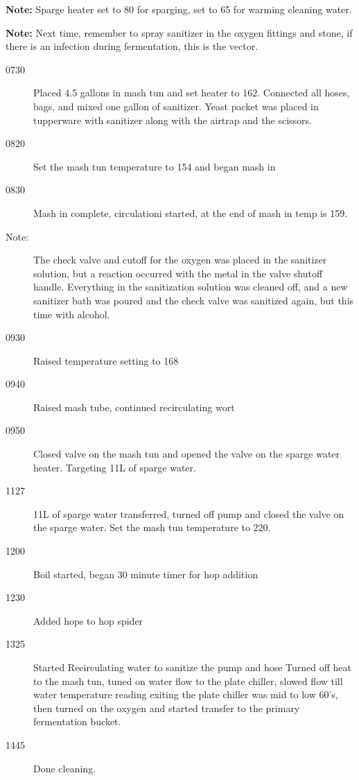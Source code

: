 \textbf{Note:} Sparge heater set to 80 for sparging, set to 65 for warming cleaning water.

\textbf{Note:} Next time, remember to spray sanitizer in the oxygen fittings and stone, if there is an infection during fermentation, this is the vector.

\def\todaysdate{20190324}
\newday{\todaysdate}\label{\todaysdate}


\begin{description}
    \item[0730] Placed 4.5 gallons in mash tun and set heater to 162.  Connected all hoses, bags, and mixed one gallon of sanitizer.  Yeast packet was placed in tupperware with sanitizer along with the airtrap and the scissors.
    \item[0820] Set the mash tun temperature to 154 and began mash in
    \item[0830] Mash in complete, circulationi started, at the end of mash in temp is 159.
    \item[Note:]  The check valve and cutoff for the oxygen was placed in the sanitizer solution, but a reaction occurred with the metal in the valve shutoff handle.  Everything in the sanitization solution was cleaned off, and a new sanitizer bath was poured and the check valve was sanitized again, but this time with alcohol.
    \item[0930] Raised temperature setting to 168
    \item[0940] Raised mash tube, continued recirculating wort
    \item[0950] Closed valve on the mash tun and opened the valve on the sparge water heater.  Targeting 11L of sparge water.
    \item[1127] 11L of sparge water transferred, turned off pump and closed the valve on the sparge water.  Set the mash tun temperature to 220.
    \item[1200] Boil started, began 30 minute timer for hop addition
    \item[1230] Added hops to hop spider
    \item[1325] Started Recirculating water to sanitize the pump and hose
 Turned off heat to the mash tun, tuned on water flow to the plate chiller, slowed flow till water temperature reading exiting the plate chiller was mid to low 60's, then turned on the oxygen and started transfer to the primary fermentation bucket.
     \item[1445] Done cleaning.
\end{description}

